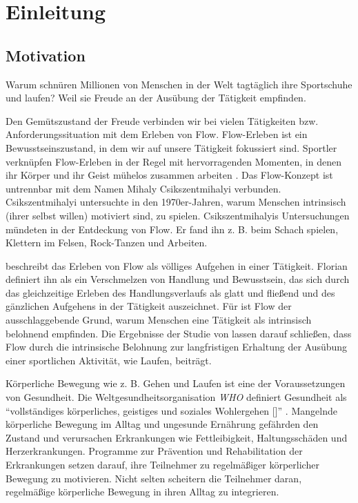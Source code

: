 \chapter{Einleitung}
\section{Motivation}

Warum schnüren Millionen von Menschen in der Welt tagtäglich ihre Sportschuhe und laufen? Weil sie Freude an der Ausübung der Tätigkeit empfinden.

Den Gemütszustand der Freude verbinden wir bei vielen Tätigkeiten bzw. Anforderungssituation mit dem Erleben von Flow. Flow-Erleben ist ein Bewusstseinszustand, in dem wir auf unsere Tätigkeit fokussiert sind. Sportler verknüpfen Flow-Erleben in der Regel mit hervorragenden Momenten, in denen ihr Körper und ihr Geist mühelos zusammen arbeiten \citep[vgl.][S.~5]{Jackson1999}. Das Flow-Konzept ist untrennbar mit dem Namen Mihaly Csikszentmihalyi verbunden. Csikszentmihalyi untersuchte in den 1970er-Jahren, warum Menschen intrinsisch (ihrer selbst willen) motiviert sind, zu spielen. Csikszentmihalyis Untersuchungen mündeten in der Entdeckung von Flow. Er fand ihn z. B. beim Schach spielen, Klettern im Felsen, Rock-Tanzen und Arbeiten.

\citet[][S.~58~f.]{Csikszentmihalyi2010} beschreibt das Erleben von Flow als völliges Aufgehen in einer Tätigkeit. Florian \citet[][S.~13]{Henk2014} definiert ihn als ein Verschmelzen von Handlung und Bewusstsein, das sich durch das gleichzeitige Erleben des Handlungsverlaufs als glatt und fließend und des gänzlichen Aufgehens in der Tätigkeit auszeichnet. Für \citet[][S.~602]{Csikszentmihalyi2005} ist Flow der ausschlaggebende Grund, warum Menschen eine Tätigkeit als intrinsisch belohnend empfinden. Die Ergebnisse der Studie von \citet[][S.~174]{Schuler2009} lassen darauf schließen, dass Flow durch die intrinsische Belohnung zur langfristigen Erhaltung der Ausübung einer sportlichen Aktivität, wie Laufen, beiträgt.

Körperliche Bewegung wie z. B. Gehen und Laufen ist eine der Voraussetzungen von Gesundheit. Die Weltgesundheitsorganisation \emph{\ac{WHO}} definiert Gesundheit als "`vollständiges körperliches, geistiges und soziales Wohlergehen [\textellipsis]"' \citep[vgl.][S.~100]{WorldHealthOrganization1948}. Mangelnde körperliche Bewegung im Alltag und ungesunde Ernährung gefährden den Zustand und verursachen Erkrankungen wie Fettleibigkeit, Haltungsschäden und Herzerkrankungen. Programme zur Prävention und Rehabilitation der Erkrankungen setzen darauf, ihre Teilnehmer zu regelmäßiger körperlicher Bewegung zu motivieren. Nicht selten scheitern die Teilnehmer daran, regelmäßige körperliche Bewegung in ihren Alltag zu integrieren.

